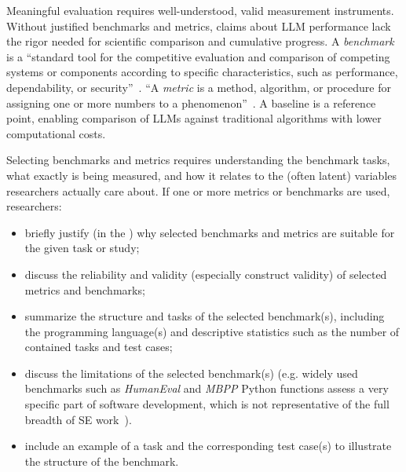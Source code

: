 

Meaningful evaluation requires well-understood, valid measurement instruments.
Without justified benchmarks and metrics, claims about LLM performance lack the rigor needed for scientific comparison and cumulative progress.
A \textit{benchmark} is a ``standard tool for the competitive evaluation and comparison of competing systems or components according to specific characteristics, such as performance, dependability, or security''~\cite{Kistowski2015Benchmark}. ``A \textit{metric} is a method, algorithm, or procedure for assigning one or more numbers to a phenomenon''~\cite{ralph2024teaching}. A baseline is a reference point, enabling comparison of LLMs against traditional algorithms with lower computational costs.


Selecting benchmarks and metrics requires understanding the benchmark tasks, what exactly is being measured, and how it relates to the (often latent) variables researchers actually care about. If one or more metrics or benchmarks are used, researchers:
\begin{itemize}
    \item \must briefly justify (in the \paper) why selected benchmarks and metrics are suitable for the given task or study;
    \item \must discuss the reliability and validity (especially construct validity) of selected metrics and benchmarks;
    \item \should summarize the structure and tasks of the selected benchmark(s), including the programming language(s) and descriptive statistics such as the number of contained tasks and test cases;
    \item \should discuss the limitations of the selected benchmark(s) (e.g. widely used benchmarks such as \emph{HumanEval} \cite{DBLP:journals/corr/abs-2107-03374} and \emph{MBPP} \cite{DBLP:journals/corr/abs-2108-07732} Python functions assess a very specific part of software development, which is not representative of the full breadth of SE work~\cite{Chandra2025benchmarks}).
    \item \should include an example of a task and the corresponding test case(s) to illustrate the structure of the benchmark.
\end{itemize}

